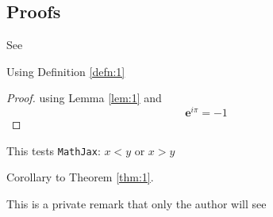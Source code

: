 \subsection{Proofs}

\begin{Lem}[A Lemma]\label{lem:1}
  \lipsum[3]

  See \cite{wiki:it:tautol}
\end{Lem}

\begin{Theorem}\label{thm:1}
  Using Definition \ref{defn:1} \\
  \lipsum[4]
  \begin{proof}
    using Lemma \ref{lem:1} and
    \begin{equation}
      \label{eq:1}
      {\mathbf{e}}^{i \pi }=-1
    \end{equation}
  \end{proof}
  This tests \texttt{MathJax}: $x<y$ or $x>y$
\end{Theorem}

\lipsum[5]

\begin{Cor}\label{cor:1}
  Corollary to Theorem \ref{thm:1}.
  \\
  \lipsum[6]
\end{Cor}

\begin{privateremark}
  This is a private remark that only the author will see
\end{privateremark}

